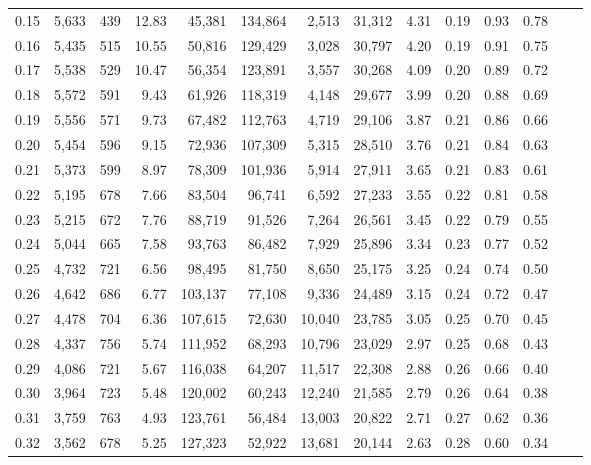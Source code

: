 \begin{tabular}{rrrrrrrrrrrrrr}
0.15 &  5,633 &  439 &   12.83 &   45,381 &  134,864 &   2,513 &  31,312 &  4.31 &  0.19 &  0.93 &      0.78 \\
0.16 &  5,435 &  515 &   10.55 &   50,816 &  129,429 &   3,028 &  30,797 &  4.20 &  0.19 &  0.91 &      0.75 \\
0.17 &  5,538 &  529 &   10.47 &   56,354 &  123,891 &   3,557 &  30,268 &  4.09 &  0.20 &  0.89 &      0.72 \\
0.18 &  5,572 &  591 &    9.43 &   61,926 &  118,319 &   4,148 &  29,677 &  3.99 &  0.20 &  0.88 &      0.69 \\
0.19 &  5,556 &  571 &    9.73 &   67,482 &  112,763 &   4,719 &  29,106 &  3.87 &  0.21 &  0.86 &      0.66 \\
0.20 &  5,454 &  596 &    9.15 &   72,936 &  107,309 &   5,315 &  28,510 &  3.76 &  0.21 &  0.84 &      0.63 \\
0.21 &  5,373 &  599 &    8.97 &   78,309 &  101,936 &   5,914 &  27,911 &  3.65 &  0.21 &  0.83 &      0.61 \\
0.22 &  5,195 &  678 &    7.66 &   83,504 &   96,741 &   6,592 &  27,233 &  3.55 &  0.22 &  0.81 &      0.58 \\
0.23 &  5,215 &  672 &    7.76 &   88,719 &   91,526 &   7,264 &  26,561 &  3.45 &  0.22 &  0.79 &      0.55 \\
0.24 &  5,044 &  665 &    7.58 &   93,763 &   86,482 &   7,929 &  25,896 &  3.34 &  0.23 &  0.77 &      0.52 \\
0.25 &  4,732 &  721 &    6.56 &   98,495 &   81,750 &   8,650 &  25,175 &  3.25 &  0.24 &  0.74 &      0.50 \\
0.26 &  4,642 &  686 &    6.77 &  103,137 &   77,108 &   9,336 &  24,489 &  3.15 &  0.24 &  0.72 &      0.47 \\
0.27 &  4,478 &  704 &    6.36 &  107,615 &   72,630 &  10,040 &  23,785 &  3.05 &  0.25 &  0.70 &      0.45 \\
0.28 &  4,337 &  756 &    5.74 &  111,952 &   68,293 &  10,796 &  23,029 &  2.97 &  0.25 &  0.68 &      0.43 \\
0.29 &  4,086 &  721 &    5.67 &  116,038 &   64,207 &  11,517 &  22,308 &  2.88 &  0.26 &  0.66 &      0.40 \\
0.30 &  3,964 &  723 &    5.48 &  120,002 &   60,243 &  12,240 &  21,585 &  2.79 &  0.26 &  0.64 &      0.38 \\
0.31 &  3,759 &  763 &    4.93 &  123,761 &   56,484 &  13,003 &  20,822 &  2.71 &  0.27 &  0.62 &      0.36 \\
0.32 &  3,562 &  678 &    5.25 &  127,323 &   52,922 &  13,681 &  20,144 &  2.63 &  0.28 &  0.60 &      0.34 \\

\end{tabular}
